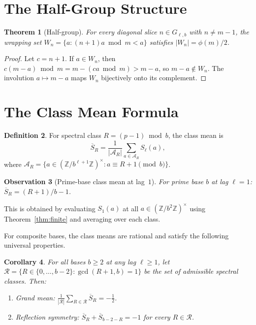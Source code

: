 \documentclass[12pt]{amsart}
\newtheorem{theorem}{Theorem}
\newtheorem{corollary}[theorem]{Corollary}
\newtheorem{observation}[theorem]{Observation}
\theoremstyle{definition}
\newtheorem{definition}[theorem]{Definition}
\theoremstyle{remark}
\begin{document}
\section{The Half-Group Structure}

\begin{theorem}[Half-group]\label{thm:half}
For every diagonal slice $n \in G_{\ell,b}$ with $n \neq m-1$,
the wrapping set
$W_n = \{a : (n{+}1)a \bmod m < a\}$
satisfies $|W_n| = \phi(m)/2$.
\end{theorem}

\begin{proof}
Let $c = n + 1$. If $a \in W_n$, then
$c(m{-}a) \bmod m = m - (ca \bmod m) > m - a$,
so $m - a \notin W_n$. The involution $a \mapsto m - a$
maps $W_n$ bijectively onto its complement.
\end{proof}

\section{The Class Mean Formula}

\begin{definition}
For spectral class $R = (p{-}1) \bmod b$, the class mean is
\[
\overline{S}_R = \frac{1}{|\mathcal{A}_R|}
\sum_{a \in \mathcal{A}_R} S_{\ell}(a),
\]
where $\mathcal{A}_R = \{a \in
(\mathbb{Z}/b^{\ell+1}\mathbb{Z})^{\times} :
a \equiv R{+}1 \pmod{b}\}$.
\end{definition}

\begin{observation}[Prime-base class mean at lag~$1$]
\label{prop:class-mean}
For prime base $b$ at lag $\ell = 1$:
$\overline{S}_R = (R{+}1)/b - 1$.
\end{observation}

This is obtained by evaluating $S_1(a)$ at all
$a \in (\mathbb{Z}/b^2\mathbb{Z})^{\times}$ using
Theorem~\ref{thm:finite} and averaging over each class.

For composite bases, the class means are rational and
satisfy the following universal properties.

\begin{corollary}\label{cor:universal}
For all bases $b \ge 2$ at any lag $\ell \ge 1$, let
$\mathcal{R} = \{R \in \{0, \ldots, b{-}2\} : \gcd(R{+}1, b) = 1\}$
be the set of admissible spectral classes. Then:
\begin{enumerate}
\item[\textup{(i)}] Grand mean:
$\displaystyle\frac{1}{|\mathcal{R}|}
\sum_{R \in \mathcal{R}} \overline{S}_R = -\frac{1}{2}$.
\item[\textup{(ii)}] Reflection symmetry:
$\overline{S}_R + \overline{S}_{b-2-R} = -1$
for every $R \in \mathcal{R}$.
\end{enumerate}
\end{corollary}
\end{document}
